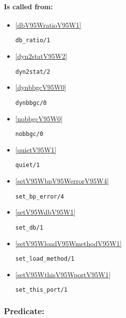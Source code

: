 \paragraph{Is called from:} 
\begin{itemize}
\item \ref{dbV95WratioV95W1} 
\begin{verbatim}
db_ratio/1
\end{verbatim}

\item \ref{dyn2statV95W2} 
\begin{verbatim}
dyn2stat/2
\end{verbatim}

\item \ref{dynbbgcV95W0} 
\begin{verbatim}
dynbbgc/0
\end{verbatim}

\item \ref{nobbgcV95W0} 
\begin{verbatim}
nobbgc/0
\end{verbatim}

\item \ref{quietV95W1} 
\begin{verbatim}
quiet/1
\end{verbatim}

\item \ref{setV95WbpV95WerrorV95W4} 
\begin{verbatim}
set_bp_error/4
\end{verbatim}

\item \ref{setV95WdbV95W1} 
\begin{verbatim}
set_db/1
\end{verbatim}

\item \ref{setV95WloadV95WmethodV95W1} 
\begin{verbatim}
set_load_method/1
\end{verbatim}

\item \ref{setV95WthisV95WportV95W1} 
\begin{verbatim}
set_this_port/1
\end{verbatim}

\end{itemize}

\subsubsection{Predicate:} \label{vsetV95WintV95W2}

